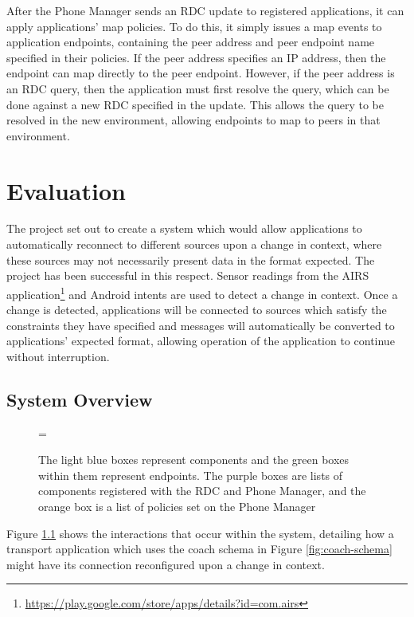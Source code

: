 \documentclass[12pt,twoside,notitlepage]{report}
\begin{document}
After the Phone Manager sends an RDC update to registered applications, it can apply applications' map policies. 
To do this, it simply issues a map events to application endpoints, containing the peer address and peer endpoint name specified in their policies. 
If the peer address specifies an IP address, then the endpoint can map directly to the peer endpoint. 
However, if the peer address is an RDC query, then the application must first resolve the query, which can be done against a new RDC specified in the update. 
This allows the query to be resolved in the new environment, allowing endpoints to map to peers in that environment. 

\cleardoublepage


\chapter{Evaluation}

The project set out to create a system which would allow applications to automatically reconnect to different sources upon a change in context, where these sources may not necessarily present data in the format expected. 
The project has been successful in this respect. Sensor readings from the AIRS application\footnote{\url{https://play.google.com/store/apps/details?id=com.airs}} and Android intents are used to detect a change in context. 
Once a change is detected, applications will be connected to sources which satisfy the constraints they have specified and messages will automatically be converted to applications' expected format, allowing operation of the application to continue without interruption.

\section{System Overview}

\begin{figure}[tbh]
\epsfxsize=\hsize
\centerline{}
\caption[System Overview]{The light blue boxes represent components and the green boxes within them represent endpoints. The purple boxes are lists of components registered with the RDC and Phone Manager, and the orange box is a list of policies set on the Phone Manager}
\label{fig:system_overview}
\end{figure}

Figure \ref{fig:system_overview} shows the interactions that occur within the system, detailing how a transport application which uses the coach schema in Figure \ref{fig:coach-schema} might have its connection reconfigured upon a change in context.
\end{document}
